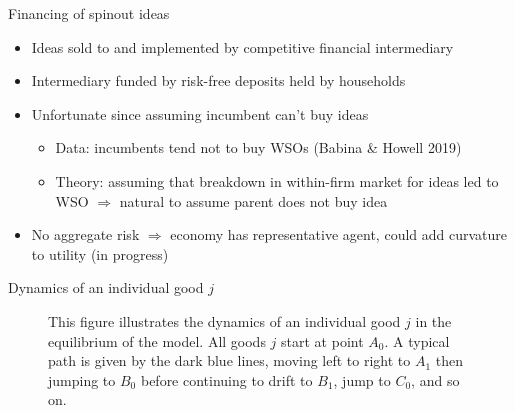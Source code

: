 \documentclass[english,usenames,dvipsnames]{beamer}
\begin{document}
\begin{frame}{Financing of spinout ideas}
\begin{itemize}
	\item Ideas sold to and implemented by competitive financial intermediary
	\item Intermediary funded by risk-free deposits held by households
	\item Unfortunate since assuming incumbent can't buy ideas 
	\begin{itemize}
		\item Data: incumbents tend not to buy WSOs (Babina \& Howell 2019)
		\item Theory: assuming that breakdown in within-firm market for ideas led to WSO $\Rightarrow$ natural to assume parent does not buy idea
	\end{itemize}
	\item No aggregate risk $\Rightarrow$ economy has representative agent, could add curvature to utility (in progress)
\end{itemize}
\end{frame}

\begin{frame}{Dynamics of an individual good $j$}
\begin{figure}
	\centering
	\resizebox{!}{.6\textheight}{}
	\caption{\scriptsize This figure illustrates the dynamics of an individual good $j$ in the equilibrium of the model. All goods $j$ start at point $A_0$. A typical path is given by the dark blue lines, moving left to right to $A_1$ then jumping to $B_0$ before continuing to drift to $B_1$, jump to $C_0$, and so on.}
	\label{individual_product_line_dynamics}
\end{figure}
\end{frame}
\end{document}

